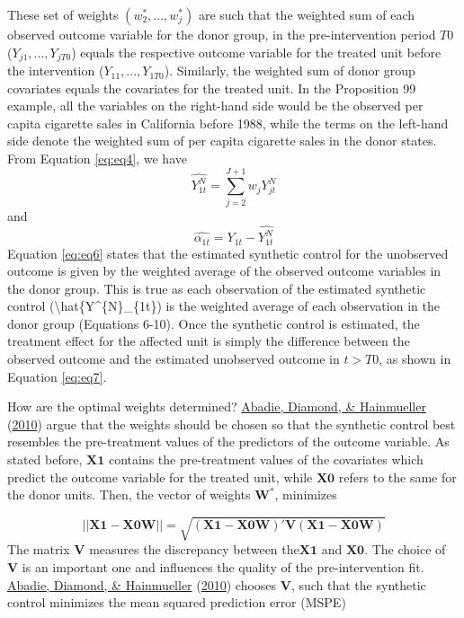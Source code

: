 \documentclass[12pt,nobind, a4paper]{reedthesis}
\begin{document}
 These set of weights \((w_{2}^{*},...,w_{j}^{*})\) are such that the weighted sum of each observed outcome variable for the donor group, in the pre-intervention period \(T0\) (\(Y_{j1},..., Y_{jT0}\)) equals the respective outcome variable for the treated unit before the intervention (\(Y_{11},...,Y_{1T0}\)). Similarly, the weighted sum of donor group covariates equals the covariates for the treated unit. In the Proposition 99 example, all the variables on the right-hand side would be the observed per capita cigarette sales in California before 1988, while the terms on the left-hand side denote the weighted sum of per capita cigarette sales in the donor states. From Equation \eqref{eq:eq4}, we have
 \begin{equation}
 \hat{Y^{N}_{1t}}=\sum_{j=2}^{J+1}w_{j}Y^{N}_{jt}
 \label{eq:eq6}
 \end{equation}
 and
 \begin{equation}
 \hat{\alpha_{1t}}={Y_{1t}}-\hat{Y^{N}_{1t}}
 \label{eq:eq7}
 \end{equation}
 Equation \eqref{eq:eq6} states that the estimated synthetic control for the unobserved outcome is given by the weighted average of the observed outcome variables in the donor group. This is true as each observation of the estimated synthetic control (\textbackslash hat\{Y\^{}\{N\}\_\{1t\}) is the weighted average of each observation in the donor group (Equations 6-10). Once the synthetic control is estimated, the treatment effect for the affected unit is simply the difference between the observed outcome and the estimated unobserved outcome in \(t>T0\), as shown in Equation \eqref{eq:eq7}.
 \linebreak

 How are the optimal weights determined? \protect\hyperlink{ref-abadie_synthetic_2010}{Abadie, Diamond, \& Hainmueller} (\protect\hyperlink{ref-abadie_synthetic_2010}{2010}) argue that the weights should be chosen so that the synthetic control best resembles the pre-treatment values of the predictors of the outcome variable. As stated before, \(\mathbf{X1}\) contains the pre-treatment values of the covariates which predict the outcome variable for the treated unit, while \(\mathbf{X0}\) refers to the same for the donor units. Then, the vector of weights \(\mathbf{W^*}\), minimizes

 \[||\mathbf{X1}-\mathbf{X0 W}||=\sqrt{(\mathbf{X1}-\mathbf{X0 W})' \mathbf{V} (\mathbf{X1}-\mathbf{X0 W})}\]
 The matrix \(\mathbf{V}\) measures the discrepancy between the\(\mathbf{X1}\) and \(\mathbf{X0}\). The choice of \(\mathbf{V}\) is an important one and influences the quality of the pre-intervention fit. \protect\hyperlink{ref-abadie_synthetic_2010}{Abadie, Diamond, \& Hainmueller} (\protect\hyperlink{ref-abadie_synthetic_2010}{2010}) chooses \(\mathbf{V}\), such that the synthetic control minimizes the mean squared prediction error (MSPE)
\end{document}
